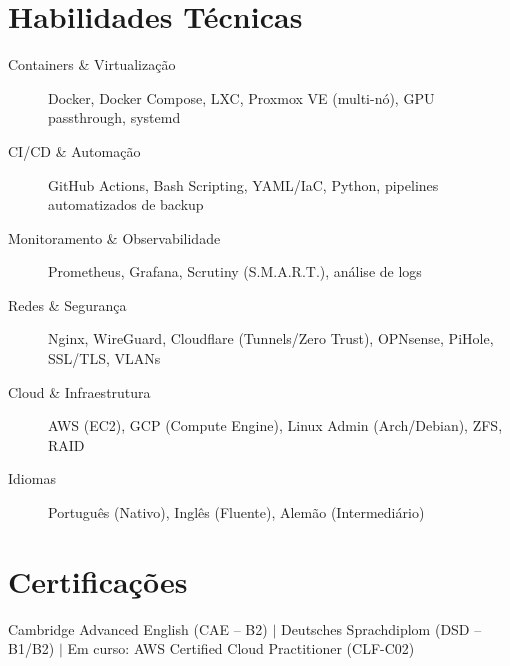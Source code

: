\documentclass[10pt]{article}
\begin{document}
\section{Habilidades T\'{e}cnicas}
\begin{description}
	\item[Containers \& Virtualiza\c{c}\~{a}o] Docker, Docker Compose, LXC, Proxmox VE (multi-n\'{o}), GPU passthrough, systemd
	\item[CI/CD \& Automa\c{c}\~{a}o] GitHub Actions, Bash Scripting, YAML/IaC, Python, pipelines automatizados de backup
	\item[Monitoramento \& Observabilidade] Prometheus, Grafana, Scrutiny (S.M.A.R.T.), an\'{a}lise de logs
	\item[Redes \& Seguran\c{c}a] Nginx, WireGuard, Cloudflare (Tunnels/Zero Trust), OPNsense, PiHole, SSL/TLS, VLANs
	\item[Cloud \& Infraestrutura] AWS (EC2), GCP (Compute Engine), Linux Admin (Arch/Debian), ZFS, RAID
	\item[Idiomas] Portugu\^{e}s (Nativo), Ingl\^{e}s (Fluente), Alem\~{a}o (Intermedi\'{a}rio)
\end{description}

\section{Certifica\c{c}\~{o}es}
Cambridge Advanced English (CAE -- B2) $|$ Deutsches Sprachdiplom (DSD -- B1/B2) $|$ Em curso: AWS Certified Cloud Practitioner (CLF-C02)
\end{document}
